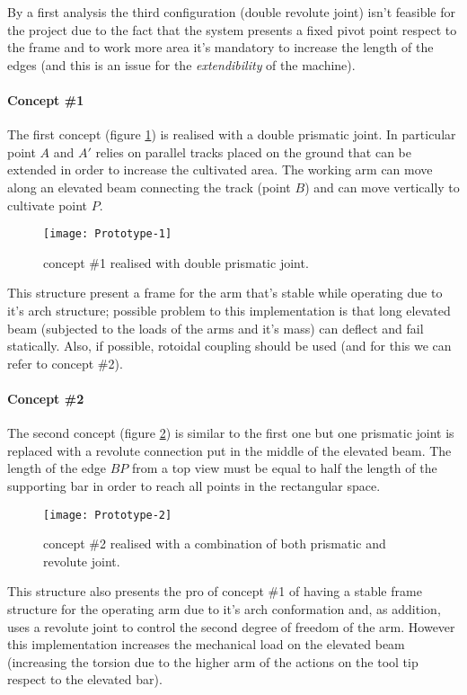 	By a first analysis the third configuration (double revolute joint) isn't feasible for the project due to the fact that the system presents a fixed pivot point respect to the frame and to work more area it's mandatory to increase the length of the edges (and this is an issue for the \textit{extendibility} of the machine).
	
	\paragraph{Concept \#1} The first concept (figure \ref{fig:prot:1}) is realised with a double prismatic joint. In particular point $A$ and $A'$ relies on parallel tracks placed on the ground that can be extended in order to increase the cultivated area. The working arm can move along an elevated beam connecting the track (point $B$) and can move vertically to cultivate point $P$.
	
	\begin{figure}[bht]
		\centering \texttt{[image: Prototype-1]}
		\caption{concept \#1 realised with double prismatic joint.}
		\label{fig:prot:1}
	\end{figure}
	
	This structure present a frame for the arm that's stable while operating due to it's arch structure; possible problem to this implementation is that long elevated beam (subjected to the loads of the arms and it's mass) can deflect and fail statically. Also, if possible, rotoidal coupling should be used (and for this we can refer to concept \#2).
	
	\paragraph{Concept \#2}	The second concept (figure \ref{fig:prot:2}) is similar to the first one but one prismatic joint is replaced with a revolute connection put in the middle of the elevated beam. The length of the edge $BP$ from a top view must be equal to half the length of the supporting bar in order to reach all points in the rectangular space.

	\begin{figure}[bht]
		\centering \texttt{[image: Prototype-2]}
		\caption{concept \#2 realised with a combination of both prismatic and revolute joint.}
		\label{fig:prot:2}
	\end{figure}
	
	This structure also presents the pro of concept \#1 of having a stable frame structure for the operating arm due to it's arch conformation and, as addition, uses a revolute joint to control the second degree of freedom of the arm. However this implementation increases the mechanical load on the elevated beam (increasing the torsion due to the higher arm of the actions on the tool tip respect to the elevated bar).
	

